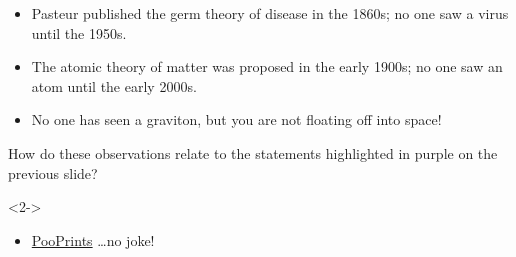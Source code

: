 \begin{frame}
    \begin{itemize}
        \item Pasteur published the germ theory of disease in the 1860s; no one
            saw a virus until the 1950s.
        \item The atomic theory of matter was proposed in the early 1900s; no
            one saw an atom until the early 2000s.
        \item No one has seen a graviton, but you are not floating off into
            space!
    \end{itemize}

    How do these observations relate to the statements highlighted in purple on
    the previous slide?
    \begin{uncoverenv}<2->
    \begin{itemize}
        \item \href{http://www.pooprints.com/}{PooPrints} \ldots no joke!
    \end{itemize}
    \end{uncoverenv}

    \vspace{1mm}

\end{frame}

